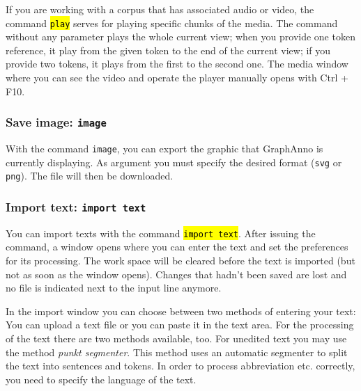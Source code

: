 \documentclass[12pt]{scrartcl}
\newcommand{\code}[1]{\hl{\texttt{#1}}}
\begin{document}
If you are working with a corpus that has associated audio or video, the command \code{play} serves for playing specific chunks of the media.
The command without any parameter plays the whole current view; when you provide one token reference, it play from the given token to the end of the current view; if you provide two tokens, it plays from the first to the second one.
The media window where you can see the video and operate the player manually opens with Ctrl + F10.


\subsubsection{Save image: \texttt{image}}

With the command \texttt{image}, you can export the graphic that GraphAnno is currently displaying.
As argument you must specify the desired format (\texttt{svg} or \texttt{png}).
The file will then be downloaded.


\subsubsection{Import text: \texttt{import text}}\label{befehl-import}

You can import texts with the command \code{import text}. After issuing the command, a window opens where you can enter the text and set the preferences for its processing.
The work space will be cleared before the text is imported (but not as soon as the window opens).
Changes that hadn’t been saved are lost and no file is indicated next to the input line anymore.

In the import window you can choose between two methods of entering your text:
You can upload a text file or you can paste it in the text area.
For the processing of the text there are two methods available, too.
For unedited text you may use the method \textit{punkt segmenter}.
This method uses an automatic segmenter to split the text into sentences and tokens.
In order to process abbreviation etc. correctly, you need to specify the language of the text.
\end{document}
